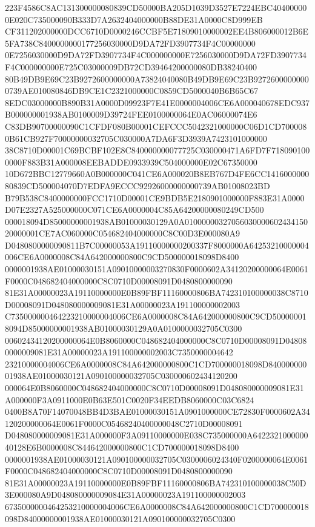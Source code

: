 \documentclass[UTF8,fontset=fandol,zihao=-4,a4paper]{ctexart}
\begin{document}
{{223F4586C8AC131300000080839CD50000BA205D1039D3527E7224EBC404000000E020C735000090B333D7A2632404000000B88DE31A0000C8D999EB
CF311202000000DCC6710D0000246CCBF5E71809010000002EE4B806000012B6E5FA738C8400000000177256030000D9DA72FD3907734F4C00000000
0E7256030000D9DA72FD3907734F4C000000000E7256030000D9DA72FD3907734F4C000000000E725C03000009DB72CD39464200000080DB38240400
80B49DB9E69C23B9272600000000A73824040080B49DB9E69C23B92726000000000739AE010080846DB9CE1C2321000000C0859CD5000040B6B65C67
8EDC03000000B890B31A0000D09923F7E41E0000004006CE6A000040678EDC937B000000001938AB0100009D39724FEE0100000064E0AC06000074E6
C83DB90700000090C1CFDF080B00001CEFCCC5042321000000C06D1CD7000080B61CB927F70000000032705C030000A7DA6F3D3939A7423101000000
38C8710D00001C69BCBF102E8C840000000077725C030000471A6FD7F7180901000000F883B31A000008EEBADDE0933939C504000000E02C67350000
10D672BBC12779660A0B000000C041CE6A000020B8EB767D4FE6CC141600000080839CD500004070D7EDFA9ECCC92926000000000739AB01008023BD
B79B538C8400000000FCC1710D00001CE9BDB5E2180901000000F883E31A0000D07E2327A525000000C071CE6A0000004C85A64200000080249CD500
000018094D85000000001938AB01000030129A0A0100000032705603000060243415020000001CE7AC060000C054682404000000C8C00D3E000080A9
D0480800000090811B7C00000053A19110000000200337F8000000A64253210000004006CE6A0000008C84A642000000800C9CD500000018098D8400
0000001938AE01000030151A09010000003270830F0000602A34120200000064E0061F0000C048682404000000C8C0710D00008091D0480800000090
81E31A00000023A19110000000E0B89FBF11160000806BA742310100000038C8710D00008091D048080000009081E31A00000023A191100000002003
C735000000464223210000004006CE6A0000008C84A642000000800C9CD500000018094D85000000001938AB01000030129A0A0100000032705C0300
00602434120200000064E0B8060000C048682404000000C8C0710D00008091D048080000009081E31A00000023A191100000002003C7350000004642
23210000004006CE6A0000008C84A642000000800C1CD700000018098D84000000001938AE01000030121A090100000032705C030000602434120200
000064E0B8060000C048682404000000C8C0710D00008091D048080000009081E31A000000F3A0911000E0B63E501C0020F34EEDB8060000C03C6824
0400B8A70F14070048BB4D3BAE01000030151A0901000000CE72830F0000602A34120200000064E0061F0000C05468240400000048C2710D00008091
D048080000009081E31A000000F3A09110000000E038C735000000A642232100000040128E6B0000008C844642000000800C1CD700000018098D8400
0000001938AE01000030121A090100000032705C0300006024340F0200000064E0061F0000C048682404000000C8C0710D00008091D0480800000090
81E31A00000023A19110000000E0B89FBF11160000806BA742310100000038C50D3E000080A9D048080000009084E31A00000023A191100000002003
6735000000464253210000004006CE6A0000008C84A642000000800C1CD700000018098D84000000001938AE01000030121A090100000032705C0300
}}
\end{document}
